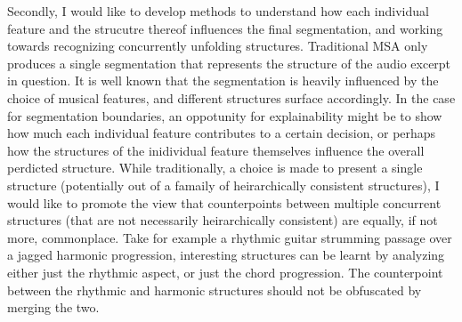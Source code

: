Secondly, I would like to develop methods to understand how each individual feature and the strucutre thereof influences the final segmentation, and working towards recognizing concurrently unfolding structures. 
Traditional MSA only produces a single segmentation that represents the structure of the audio excerpt in question. 
It is well known that the segmentation is heavily influenced by the choice of musical features, and different structures surface accordingly. 
In the case for segmentation boundaries, an oppotunity for explainability might be to show how much each individual feature contributes to a certain decision, or perhaps how the structures of the inidividual feature themselves influence the overall perdicted structure.
While traditionally, a choice is made to present a single structure (potentially out of a famaily of heirarchically consistent structures), I would like to promote the view that counterpoints between multiple concurrent structures (that are not necessarily heirarchically consistent) are equally, if not more, commonplace. 
Take for example a rhythmic guitar strumming passage over a jagged harmonic progression, interesting structures can be learnt by analyzing either just the rhythmic aspect, or just the chord progression. 
The counterpoint between the rhythmic and harmonic structures should not be obfuscated by merging the two.




